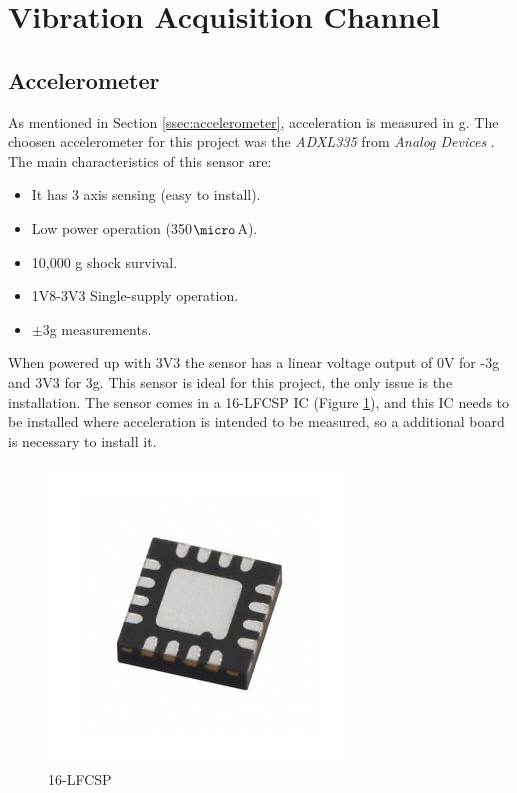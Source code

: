 \section{Vibration Acquisition Channel}\label{sec:vibration-acquisition-channel}

\subsection{Accelerometer}\label{ssec:accelerometer-signal}
	As mentioned in Section \ref{ssec:accelerometer}, acceleration is measured in g. The choosen accelerometer for this project was the \textit{ADXL335} from \textit{Analog Devices} \cite{devices2010adxl335}. The main characteristics of this sensor are:

	\begin{itemize}
		\item It has 3 axis sensing (easy to install).
		\item Low power operation (350$\micro$A).
		\item 10,000 g shock survival.
		\item 1V8-3V3 Single-supply operation.
		\item $\pm$3g measurements.
	\end{itemize}

	When powered up with 3V3 the sensor has a linear voltage output of 0V for -3g and 3V3 for 3g. This sensor is ideal for this project, the only issue is the installation. The sensor comes in a 16-LFCSP IC (Figure \ref{fig:16lfcsp}), and this IC needs to be installed where acceleration is intended to be measured, so a additional board is necessary to install it. 

	\begin{figure}[htbp]
		\centering
			\includegraphics[scale=0.95]{figuras/fig-16lfcsp.jpg}
		\caption{16-LFCSP \cite{16lfcsp}}
		\label{fig:16lfcsp}
	\end{figure}

